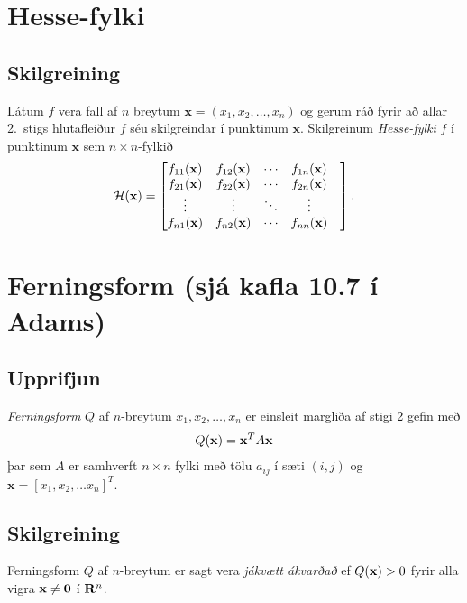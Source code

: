 \documentclass[a4paper,10pt,icelandic]{sphinxmanual}
\begin{document}
\section{Hesse-fylki}
\label{Kafli3:hesse-fylki}

\subsection{Skilgreining}
\label{Kafli3:id5}
Látum \(f\) vera fall af \(n\) breytum
\(\mathbf{x} = (x_1,x_2,\ldots,x_n)\) og gerum ráð fyrir að allar
2. stigs hlutafleiður \(f\) séu skilgreindar í punktinum
\(\mathbf{x}\). Skilgreinum \emph{Hesse-fylki} \(f\) í punktinum
\(\mathbf{x}\) sem \(n\times n\)-fylkið
\begin{gather}
\begin{split}{\cal H}(\mathbf{x})=\begin{bmatrix} f_{11}(\mathbf{x})&f_{12}(\mathbf{x}) & \cdots & f_{1n}(\mathbf{x})\\
 f_{21}(\mathbf{x})&f_{22}(\mathbf{x}) & \cdots & f_{2n}(\mathbf{x}) \\
 \vdots & \vdots & \ddots & \vdots & \\
  f_{n1}(\mathbf{x})&f_{n2}(\mathbf{x}) & \cdots & f_{nn}(\mathbf{x})\end{bmatrix}.\end{split}\notag
\end{gather}

\section{Ferningsform (sjá kafla 10.7 í Adams)}
\label{Kafli3:index-3}\label{Kafli3:ferningsform-sja-kafla-10-7-i-adams}

\subsection{Upprifjun}
\label{Kafli3:id6}
\textit{Ferningsform} \(Q\) af \(n\)-breytum
\(x_1,x_2,\ldots, x_n\) er einsleit margliða af stigi 2 gefin með
\begin{gather}
\begin{split}Q(\mathbf{x}) = \mathbf{x}^T A \mathbf{x}\end{split}\notag
\end{gather}
þar sem \(A\) er samhverft \(n \times n\) fylki með tölu
\(a_{ij}\) í sæti \((i,j)\) og
\(\mathbf{x} = [x_1,x_2,\ldots x_n]^T\).


\subsection{Skilgreining}
\label{Kafli3:id7}
Ferningsform \(Q\) af \(n\)-breytum er sagt vera \textit{jákvætt ákvarðað} ef \(Q(\mbox{${\bf x}$})>0\) fyrir
alla vigra \(\mbox{${\bf x}$}\neq \mbox{${\bf 0}$}\) í
\(\mbox{${\bf R}^n$}\).
\end{document}
